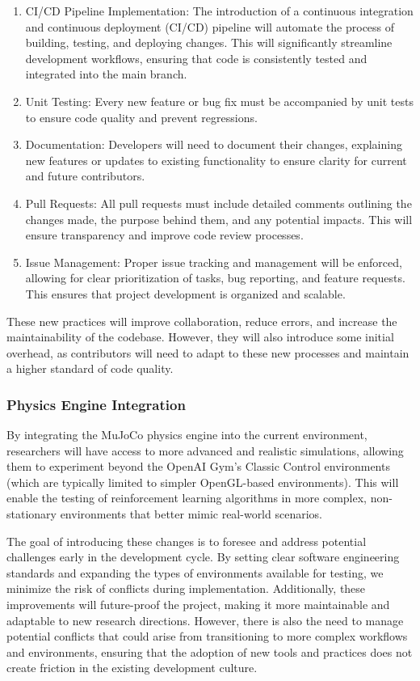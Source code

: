 \documentclass[12pt]{article}
\begin{document}
\begin{enumerate}
  \item CI/CD Pipeline Implementation: The introduction of a continuous integration and continuous deployment (CI/CD) pipeline will automate the process of building, testing, and deploying changes. This will significantly streamline development workflows, ensuring that code is consistently tested and integrated into the main branch.
  \item Unit Testing: Every new feature or bug fix must be accompanied by unit tests to ensure code quality and prevent regressions.
  \item Documentation: Developers will need to document their changes, explaining new features or updates to existing functionality to ensure clarity for current and future contributors.
  \item Pull Requests: All pull requests must include detailed comments outlining the changes made, the purpose behind them, and any potential impacts. This will ensure transparency and improve code review processes.
  \item Issue Management: Proper issue tracking and management will be enforced, allowing for clear prioritization of tasks, bug reporting, and feature requests. This ensures that project development is organized and scalable.
\end{enumerate}

These new practices will improve collaboration, reduce errors, and increase the maintainability of the codebase. However, they will also introduce some initial overhead, as contributors will need to adapt to these new processes and maintain a higher standard of code quality.

\subsubsection{Physics Engine Integration}

By integrating the MuJoCo physics engine into the current environment, researchers will have access to more advanced and realistic simulations, allowing them to experiment beyond the OpenAI Gym's Classic Control environments (which are typically limited to simpler OpenGL-based environments). This will enable the testing of reinforcement learning algorithms in more complex, non-stationary environments that better mimic real-world scenarios.

The goal of introducing these changes is to foresee and address potential challenges early in the development cycle. By setting clear software engineering standards and expanding the types of environments available for testing, we minimize the risk of conflicts during implementation. Additionally, these improvements will future-proof the project, making it more maintainable and adaptable to new research directions. However, there is also the need to manage potential conflicts that could arise from transitioning to more complex workflows and environments, ensuring that the adoption of new tools and practices does not create friction in the existing development culture.
\end{document}

